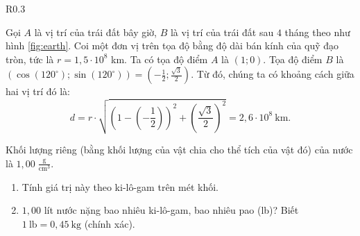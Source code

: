\documentclass[a4paper, titlepage, openany]{book}
\newcounter{exercise}
\numberwithin{equation}{chapter}
\begin{document}
\begin{wrapfigure}{R}{0.3\textwidth}
   \centering
   \caption{Quỹ đạo trái đất}
   \label{fig:earth}
\end{wrapfigure}

Gọi $A$ là vị trí của trái đất bây giờ, $B$ là vị trí của trái đất sau $4$ tháng theo như hình \ref{fig:earth}. Coi một đơn vị trên tọa độ bằng độ dài bán kính của quỹ đạo tròn, tức là $r=1{,}5\cdot10^8$ km. Ta có tọa độ điểm $A$ là $(1;0)$. Tọa độ điểm $B$ là $\left(\cos(120^{\circ}); \sin(120^{\circ})\right)=\left(-\frac{1}{2}; \frac{\sqrt{3}}{2}\right)$. Từ đó, chúng ta có khoảng cách giữa hai vị trí đó là: $$d = r\cdot \sqrt{\left(1-\left(-\frac{1}{2}\right)\right)^2 + \left(\frac{\sqrt{3}}{2}\right)^2}=\boxed{2{,}6\cdot10^8\ \text{km}}.$$

\exercise Khối lượng riêng (bằng khối lượng của vật chia cho thể tích của vật đó) của nước là $1{,}00 \;\frac{\text{g}}{\text{cm}^3}$.
\begin{enumerate}
   \item Tính giá trị này theo ki-lô-gam trên mét khối.
   \item $1{,}00$ lít nước nặng bao nhiêu ki-lô-gam, bao nhiêu pao (lb)? Biết $1\ \text{lb} = 0{,}45\ \text{kg}$ (chính xác).
\end{enumerate}
\end{document}
